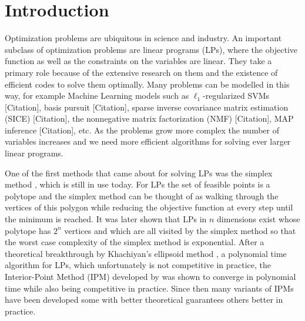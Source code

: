 \chapter{Introduction}


Optimization problems are ubiquitous in science and industry.
An important subclass of optimization problems are linear programs (LPs), where the objective function as well as the constraints on the variables are linear.
They take a primary role because of the extensive research on them and the existence of efficient codes to solve them optimally.
Many problems can be modelled in this way, for example Machine Learning models such as \(\ell_1\)-regularized SVMs [Citation], basis pursuit [Citation], sparse inverse covariance matrix estimation (SICE) [Citation], the nonnegative matrix factorization (NMF) [Citation], MAP inference [Citation], etc. %
As the problems grow more complex the number of variables increases and we need more efficient algorithms for solving ever larger linear programs.

One of the first methods that came about for solving LPs was the simplex method \cite{Dantzig-Simplex}, which is still in use today.
For LPs the set of feasible points is a polytope and the simplex method can be thought of as walking through the vertices of this polygon while reducing the objective function at every step until the minimum is reached.
It was later shown that LPs in \(n\) dimensions exist whose polytope has \(2^n\) vertices and which are all visited by the simplex method so that the worst case complexity of the simplex method is exponential.
After a theoretical breakthrough by Khachiyan's ellipsoid method \cite{Khachiyan-Ellipsoid1,Khachiyan-Ellipsoid2}, a polynomial time algorithm for LPs, which unfortunately is not competitive in practice, the Interior-Point Method (IPM) developed by \textcite{Karmarkar-IPM} was shown to converge in polynomial time while also being competitive in practice.
Since then many variants of IPMs have been developed some with better theoretical guarantees others better in practice.

